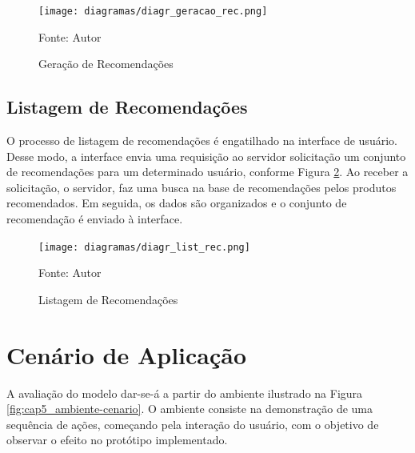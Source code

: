 \begin{figure}[H]
    \caption{Geração de Recomendações}
    \label{fig:cap5_diagr_geracao_rec}
    \texttt{[image: diagramas/diagr\_geracao\_rec.png]}
    
    \footnotesize{Fonte: Autor}
\end{figure}

\subsection{Listagem de Recomendações}

O processo de listagem de recomendações é engatilhado na interface de usuário. Desse modo, a interface envia uma requisição ao servidor solicitação um conjunto de recomendações para um determinado usuário, conforme Figura \ref{fig:cap5_diagr_lista_rec}.  Ao receber a solicitação, o servidor, faz uma busca na base de recomendações pelos produtos recomendados. Em seguida, os dados são organizados e o conjunto de recomendação é enviado à interface.

\begin{figure}[htb]
    \caption{Listagem de Recomendações}
    \label{fig:cap5_diagr_lista_rec}
    \texttt{[image: diagramas/diagr\_list\_rec.png]}
    
    \footnotesize{Fonte: Autor}
\end{figure}


\section{Cenário de Aplicação}

A avaliação do modelo dar-se-á a partir do ambiente ilustrado na Figura \ref{fig:cap5_ambiente-cenario}. O ambiente consiste na demonstração de uma sequência de ações, começando pela interação do usuário, com o objetivo de observar o efeito no protótipo implementado.

